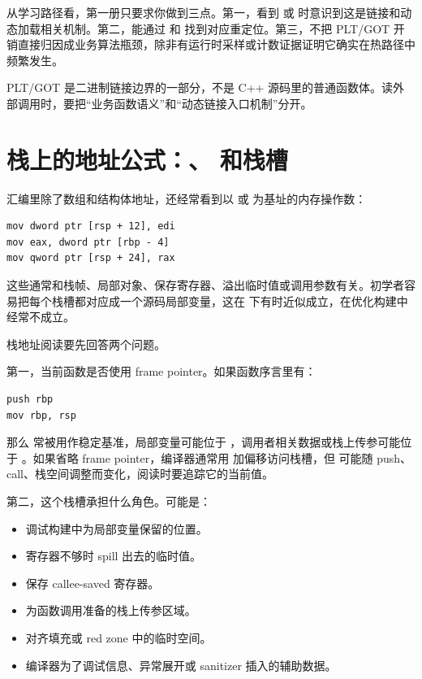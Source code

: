 从学习路径看，第一册只要求你做到三点。第一，看到  或  时意识到这是链接和动态加载相关机制。第二，能通过  和  找到对应重定位。第三，不把 PLT/GOT 开销直接归因成业务算法瓶颈，除非有运行时采样或计数证据证明它确实在热路径中频繁发生。

\begin{warningbox}
PLT/GOT 是二进制链接边界的一部分，不是 C++ 源码里的普通函数体。读外部调用时，要把“业务函数语义”和“动态链接入口机制”分开。
\end{warningbox}

\section{栈上的地址公式：、 和栈槽}

汇编里除了数组和结构体地址，还经常看到以  或  为基址的内存操作数：

\begin{lstlisting}
mov dword ptr [rsp + 12], edi
mov eax, dword ptr [rbp - 4]
mov qword ptr [rsp + 24], rax
\end{lstlisting}

这些通常和栈帧、局部对象、保存寄存器、溢出临时值或调用参数有关。初学者容易把每个栈槽都对应成一个源码局部变量，这在  下有时近似成立，在优化构建中经常不成立。

栈地址阅读要先回答两个问题。

第一，当前函数是否使用 frame pointer。如果函数序言里有：

\begin{lstlisting}
push rbp
mov rbp, rsp
\end{lstlisting}

那么  常被用作稳定基准，局部变量可能位于 ，调用者相关数据或栈上传参可能位于 。如果省略 frame pointer，编译器通常用  加偏移访问栈槽，但  可能随 push、call、栈空间调整而变化，阅读时要追踪它的当前值。

第二，这个栈槽承担什么角色。可能是：

\begin{itemize}
  \item 调试构建中为局部变量保留的位置。
  \item 寄存器不够时 spill 出去的临时值。
  \item 保存 callee-saved 寄存器。
  \item 为函数调用准备的栈上传参区域。
  \item 对齐填充或 red zone 中的临时空间。
  \item 编译器为了调试信息、异常展开或 sanitizer 插入的辅助数据。
\end{itemize}

